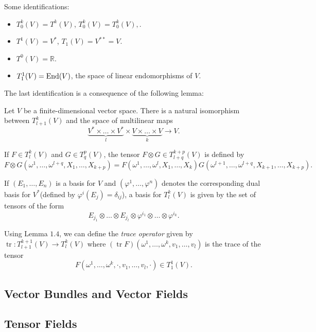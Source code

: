 \documentclass[11pt]{scrartcl}
\newcommand{\R}{\mathbb{R}}
\newcommand{\<}{\langle}
\renewcommand{\>}{\rangle}
\let \phi \varphi
\let \tensor \otimes
\newcommand{\1}{\textbf{1}} %
\begin{document}
Some identifications:
\begin{itemize}
\item $T_0^k(V) = T^k(V)$, $T^k_0(V) = T^k_0(V),$.
\item $T^1(V) = V^*$, $T_1(V) = V^{**} = V$.
\item $T^0(V) = \R$.
\item $T^1_1(V) = \operatorname{End}(V)$, the space of linear endomorphisms of $V$.
\end{itemize}

The last identification is a consequence of the following lemma:
\begin{lemma} Let $V$ be a finite-dimensional vector space.  There is a natural isomorphism between $T^k_{l + 1}(V)$ and the space of multilinear maps
$$\underbrace{V^* \times \dots \times V^*}_{l} \times \underbrace{V \times \dots \times V}_k \to V.$$
\end{lemma}
\begin{definition} If $F \in T_l^k(V)$ and $G \in T_q^p(V)$, the tensor $F \tensor G \in T_{l + q}^{k + p}(V)$ is defined by 
$$F \tensor G(\omega^1, \dots, \omega^{l + q}, X_1, \dots, X_{k +p}) = F(\omega^1, \dots, \omega^l, X_1, \dots, X_k)G(\omega^{l + 1}, \dots, \omega^{l + q}, X_{k + 1}, \dots, X_{k + p}).$$
\end{definition}

If $(E_1, \dots, E_n)$ is a basis for $V$ and $(\phi^1, \dots, \phi^n)$ denotes the corresponding dual basis for $V^*$(defined by $\phi^i(E_j) = \delta_{ij}$), a basis for $T_l^k(V)$ is given by the set of tensors of the form
$$E_{j_1} \tensor \dots \tensor E_{j_l} \tensor \phi^{i_1} \tensor \dots \tensor \phi^{i_k}.$$


\newcommand{\tr}{\operatorname{tr}}

\begin{definition}[Trace]
Using Lemma $1.4$, we can define the \textit{trace operator} given by $\tr: T_{l+1}^{k + 1}(V) \to T^{k}_l(V)$ where $(\tr F)(\omega^1, \dots, \omega^k, v_1, \dots, v_l)$ is the trace of the tensor
$$F(\omega^1, \dots, \omega^k, \cdot, v_1, \dots, v_l, \cdot) \in T_1^1(V).$$
\end{definition}

\subsection{Vector Bundles and Vector Fields}
\subsection{Tensor Fields}
\end{document}
